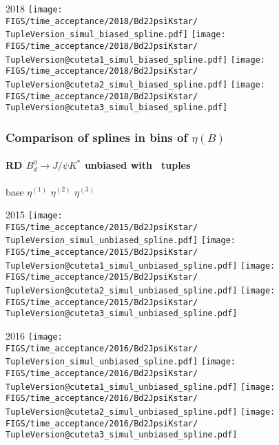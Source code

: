 \begin{frame}
  2018
  \texttt{[image: \\FIGS/time\_acceptance/2018/Bd2JpsiKstar/\\TupleVersion\_simul\_biased\_spline.pdf]}
  \texttt{[image: \\FIGS/time\_acceptance/2018/Bd2JpsiKstar/\\TupleVersion@cuteta1\_simul\_biased\_spline.pdf]}
  \texttt{[image: \\FIGS/time\_acceptance/2018/Bd2JpsiKstar/\\TupleVersion@cuteta2\_simul\_biased\_spline.pdf]}
  \texttt{[image: \\FIGS/time\_acceptance/2018/Bd2JpsiKstar/\\TupleVersion@cuteta3\_simul\_biased\_spline.pdf]}

\end{frame} %



\begin{frame} %
\frametitle{Comparison of splines in bins of $\eta(B)$}
\framesubtitle{RD $B_d^0\rightarrow J/\psi K^*$ unbiased with \TupleVersion\, tuples}

  \phantom{2020} base \hspace*{1.5cm} $\eta^{(1)}$ \hspace*{1.5cm} $\eta^{(2)}$ \hspace*{1.5cm} $\eta^{(3)}$

  2015
  \texttt{[image: \\FIGS/time\_acceptance/2015/Bd2JpsiKstar/\\TupleVersion\_simul\_unbiased\_spline.pdf]}
  \texttt{[image: \\FIGS/time\_acceptance/2015/Bd2JpsiKstar/\\TupleVersion@cuteta1\_simul\_unbiased\_spline.pdf]}
  \texttt{[image: \\FIGS/time\_acceptance/2015/Bd2JpsiKstar/\\TupleVersion@cuteta2\_simul\_unbiased\_spline.pdf]}
  \texttt{[image: \\FIGS/time\_acceptance/2015/Bd2JpsiKstar/\\TupleVersion@cuteta3\_simul\_unbiased\_spline.pdf]}
  \vspace*{2mm}

  2016
  \texttt{[image: \\FIGS/time\_acceptance/2016/Bd2JpsiKstar/\\TupleVersion\_simul\_unbiased\_spline.pdf]}
  \texttt{[image: \\FIGS/time\_acceptance/2016/Bd2JpsiKstar/\\TupleVersion@cuteta1\_simul\_unbiased\_spline.pdf]}
  \texttt{[image: \\FIGS/time\_acceptance/2016/Bd2JpsiKstar/\\TupleVersion@cuteta2\_simul\_unbiased\_spline.pdf]}
  \texttt{[image: \\FIGS/time\_acceptance/2016/Bd2JpsiKstar/\\TupleVersion@cuteta3\_simul\_unbiased\_spline.pdf]}
  \vspace*{2mm}


\end{frame}
